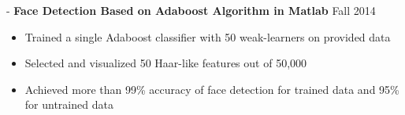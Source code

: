 \documentclass[12pt]{res}
\begin{document}
\begin{resume}
 -\sectionwidth \resumewidth
\textbf{Face Detection Based on Adaboost Algorithm in Matlab}   \hfill{Fall 2014}  \hspace{-0.58in}\vspace{-0mm}\\
\vspace{-14pt}
 \begin{itemize}[leftmargin=-0.1in]
  \item Trained a single Adaboost classifier with 50 weak-learners on provided data  \vspace{-4pt}
  \item Selected and visualized 50 Haar-like features out of 50,000\vspace{-4pt}
  \item Achieved more than 99\% accuracy of face detection for trained data and 95\% for untrained data\vspace{-3pt}
  \end{itemize}\vspace{-10pt}


   


\end{resume}
\end{document}
